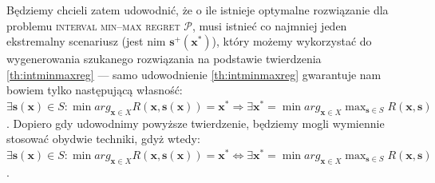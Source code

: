 Będziemy chcieli zatem udowodnić, że o ile istnieje optymalne rozwiązanie dla problemu \textsc{interval min--max regret $\mathcal{P}$}, musi istnieć co najmniej jeden ekstremalny scenariusz (jest nim $\textbf{s}^{+} \left( \textbf{x}^{\ast} \right)$), który możemy wykorzystać do wygenerowania szukanego rozwiązania na podstawie twierdzenia \ref{th:intminmaxreg} --- samo udowodnienie \ref{th:intminmaxreg} gwarantuje nam bowiem tylko następującą własność: $\exists \textbf{s} \left( \textbf{x} \right) \in S : \min arg_{\textbf{x} \in X} R \left( \textbf{x}, \textbf{s} \left( \textbf{x} \right) \right) = \textbf{x}^{\ast} \Rightarrow \exists \textbf{x}^{\ast} = \min arg_{\textbf{x} \in X} \max_{\textbf{s} \in S} R \left( \textbf{x}, \textbf{s} \right)$. Dopiero gdy udowodnimy powyższe twierdzenie, będziemy mogli wymiennie stosować obydwie techniki, gdyż wtedy: $\exists \textbf{s} \left( \textbf{x} \right) \in S : \min arg_{\textbf{x} \in X} R \left( \textbf{x}, \textbf{s} \left( \textbf{x} \right) \right) = \textbf{x}^{\ast} \Leftrightarrow \exists \textbf{x}^{\ast} = \min arg_{\textbf{x} \in X} \max_{\textbf{s} \in S} R \left( \textbf{x}, \textbf{s} \right)$.
\\

